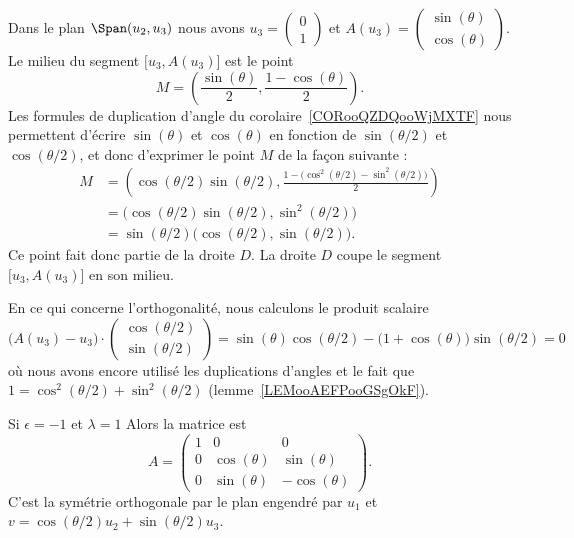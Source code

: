 \begin{subproof}
    Dans le plan \( \Span(u_2,u_3)\) nous avons \( u_3=\begin{pmatrix}
        0    \\
        1
    \end{pmatrix}\) et \( A(u_3)=\begin{pmatrix}
        \sin(\theta)    \\
        \cos(\theta)
    \end{pmatrix}\). Le milieu du segment \( \mathopen[ u_3 , A(u_3) \mathclose]\) est le point
    \begin{equation}
        M=\left( \frac{ \sin(\theta) }{2},\frac{ 1-\cos(\theta) }{2} \right).
    \end{equation}
    Les formules de duplication d'angle du corolaire~\ref{CORooQZDQooWjMXTF} nous permettent d'écrire \( \sin(\theta)\) et \( \cos(\theta)\) en fonction de \( \sin(\theta/2)\) et \( \cos(\theta/2)\), et donc d'exprimer le point \( M\) de la façon suivante :
    \begin{subequations}
        \begin{align}
            M&=\left( \cos(\theta/2)\sin(\theta/2),\frac{ 1-\big( \cos^2(\theta/2)-\sin^2(\theta/2) \big) }{2} \right)\\
            &=\big( \cos(\theta/2)\sin(\theta/2),\sin^2(\theta/2) \big)\\
            &=\sin(\theta/2)\big( \cos(\theta/2),\sin(\theta/2) \big).
        \end{align}
    \end{subequations}
    Ce point fait donc partie de la droite \( D\). La droite \( D\) coupe le segment \( \mathopen[ u_3 , A(u_3) \mathclose]\) en son milieu.

    En ce qui concerne l'orthogonalité, nous calculons le produit scalaire
    \begin{equation}
            \big( A(u_3)-u_3 \big)\cdot\begin{pmatrix}
                \cos(\theta/2)    \\
                \sin(\theta/2)
            \end{pmatrix}
            =\sin(\theta)\cos(\theta/2)-\big( 1+\cos(\theta) \big)\sin(\theta/2)=0
    \end{equation}
    où nous avons encore utilisé les duplications d'angles et le fait que \( 1=\cos^2(\theta/2)+\sin^2(\theta/2)\) (lemme~\ref{LEMooAEFPooGSgOkF}).

    \item[Si \( \epsilon=-1\) et \( \lambda=1\)] Alors la matrice est
        \begin{equation}
            A=\begin{pmatrix}
                1    &   0    &   0    \\
                0    &   \cos(\theta)    &   \sin(\theta)    \\
                0    &   \sin(\theta)    &   -\cos(\theta)
            \end{pmatrix}.
        \end{equation}
        C'est la symétrie orthogonale par le plan engendré par \( u_1\) et \( v=\cos(\theta/2)u_2+\sin(\theta/2)u_3\).


\end{subproof}
